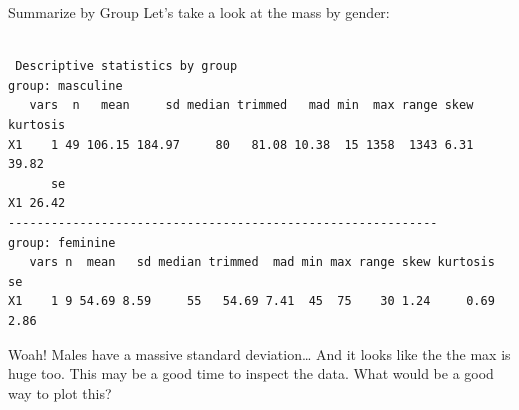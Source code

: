 \documentclass[
  ignorenonframetext,
]{beamer}
\newenvironment{Shaded}{\begin{snugshade}}{\end{snugshade}}
\newcommand{\FunctionTok}[1]{\textcolor[rgb]{0.28,0.35,0.67}{#1}}
\newcommand{\NormalTok}[1]{\textcolor[rgb]{0.00,0.23,0.31}{#1}}
\newcommand{\SpecialCharTok}[1]{\textcolor[rgb]{0.37,0.37,0.37}{#1}}
\begin{document}
\begin{frame}[fragile]{Summarize by Group}
\protect\hypertarget{summarize-by-group}{}
Let's take a look at the mass by gender:

\begin{Shaded}
\end{Shaded}

\begin{verbatim}

 Descriptive statistics by group 
group: masculine
   vars  n   mean     sd median trimmed   mad min  max range skew kurtosis
X1    1 49 106.15 184.97     80   81.08 10.38  15 1358  1343 6.31    39.82
      se
X1 26.42
------------------------------------------------------------ 
group: feminine
   vars n  mean   sd median trimmed  mad min max range skew kurtosis   se
X1    1 9 54.69 8.59     55   54.69 7.41  45  75    30 1.24     0.69 2.86
\end{verbatim}

Woah! Males have a massive standard deviation\ldots{} And it looks like
the the max is huge too. This may be a good time to inspect the data.
What would be a good way to plot this?
\end{frame}
\end{document}
